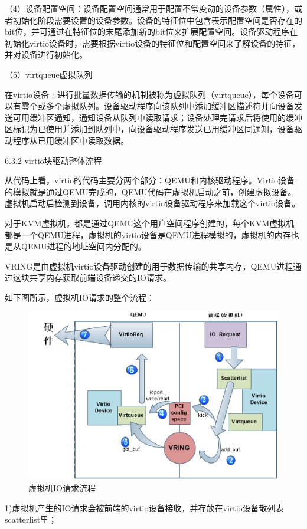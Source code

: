（4）设备配置空间：设备配置空间通常用于配置不常变动的设备参数（属性），或者初始化阶段需要设置的设备参数。设备的特征位中包含表示配置空间是否存在的bit位，并可通过在特征位的末尾添加新的bit位来扩展配置空间。设备驱动程序在初始化virtio设备时，需要根据virtio设备的特征位和配置空间来了解设备的特征，并对设备进行初始化。

（5）virtqueue虚拟队列

在virtio设备上进行批量数据传输的机制被称为虚拟队列（virtqueue），每个设备可以有零个或多个虚拟队列。设备驱动程序向该队列中添加缓冲区描述符并向设备发送可用缓冲区通知，通知设备从队列中读取请求；设备处理完请求后将使用的缓冲区标记为已使用并添加到队列中，向设备驱动程序发送已用缓冲区同通知，设备驱动程序从已用缓冲区中读取数据。

6.3.2 virtio块驱动整体流程

从代码上看，virtio的代码主要分两个部分：QEMU和内核驱动程序。Virtio设备的模拟就是通过QEMU完成的，QEMU代码在虚拟机启动之前，创建虚拟设备。虚拟机启动后检测到设备，调用内核的virtio设备驱动程序来加载这个virtio设备。

对于KVM虚拟机，都是通过QEMU这个用户空间程序创建的，每个KVM虚拟机都是一个QEMU进程，虚拟机的virtio设备是QEMU进程模拟的，虚拟机的内存也是从QEMU进程的地址空间内分配的。

VRING是由虚拟机virtio设备驱动创建的用于数据传输的共享内存，QEMU进程通过这块共享内存获取前端设备递交的IO请求。

如下图所示，虚拟机IO请求的整个流程：

\begin{figure}[H]
    \centering
    \includegraphics{figures/06-03-2.png}
    \caption{虚拟机IO请求流程}
\end{figure}
1)虚拟机产生的IO请求会被前端的virtio设备接收，并存放在virtio设备散列表scatterlist里；

